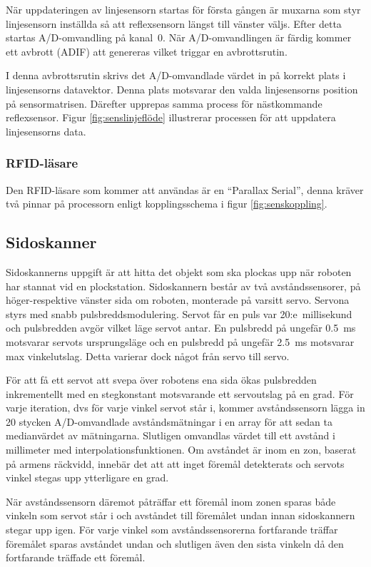 När uppdateringen av linjesensorn startas för första gången är muxarna som styr linjesensorn inställda så att reflexsensorn längst till vänster väljs. Efter detta startas A/D-omvandling på kanal~0. När A/D-omvandlingen är färdig kommer ett avbrott (ADIF) att genereras vilket triggar en avbrottsrutin.

I denna avbrottsrutin skrivs det A/D-omvandlade värdet in på korrekt plats i linjesensorns datavektor. Denna plats motsvarar den valda linjesensorns position på sensormatrisen. Därefter upprepas samma process för nästkommande reflexsensor. Figur \ref{fig:senslinjeflöde} illustrerar processen för att uppdatera linjesensorns data.

\subsubsection{RFID-läsare}
Den RFID-läsare som kommer att användas är en “Parallax Serial”, denna kräver två pinnar på processorn enligt kopplingsschema i figur \ref{fig:senskoppling}.

\subsection{Sidoskanner}
Sidoskannerns uppgift är att hitta det objekt som ska plockas upp när roboten har stannat vid en plockstation. Sidoskannern består av två avståndssensorer, på höger-respektive vänster sida om roboten, monterade på varsitt servo. Servona styrs med snabb pulsbreddsmodulering. Servot får en puls var 20:e~millisekund och pulsbredden avgör vilket läge servot antar. En pulsbredd på ungefär 0.5~ms motsvarar servots ursprungsläge och en pulsbredd på ungefär 2.5~ms motsvarar max vinkelutslag. Detta varierar dock något från servo till servo.

För att få ett servot att svepa över robotens ena sida ökas pulsbredden inkrementellt med en stegkonstant motsvarande ett servoutslag på en grad. För varje iteration, dvs för varje vinkel servot står i, kommer avståndssensorn lägga in 20 stycken A/D-omvandlade avståndsmätningar i en array för att sedan ta medianvärdet av mätningarna. Slutligen omvandlas värdet till ett avstånd i millimeter med interpolationsfunktionen. Om avståndet är inom en zon, baserat på armens räckvidd, innebär det att att inget föremål detekterats och servots vinkel stegas upp ytterligare en grad. 

När avståndssensorn däremot påträffar ett föremål inom zonen sparas både vinkeln som servot står i och avståndet till föremålet undan innan sidoskannern stegar upp igen. För varje vinkel som avståndssensorerna fortfarande träffar föremålet sparas avståndet undan och slutligen även den sista vinkeln då den fortfarande träffade ett föremål.

